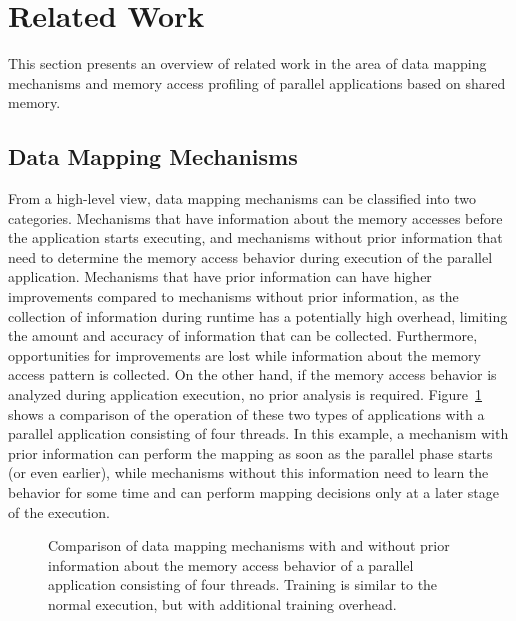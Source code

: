 
\section{Related Work}
\label{sec:soa}

This section presents an overview of related work in the area of data mapping mechanisms and memory access profiling of parallel applications based on shared memory.

\subsection{Data Mapping Mechanisms}
\label{sec:soa-mapping}

From a high-level view, data mapping mechanisms can be classified into two categories.
Mechanisms that have information about the memory accesses before the application starts executing, and mechanisms without prior information that need to determine the memory access behavior during execution of the parallel application.
Mechanisms that have prior information can have higher improvements compared to mechanisms without prior information, as the collection of information during runtime has a potentially high overhead, limiting the amount and accuracy of information that can be collected.
Furthermore, opportunities for improvements are lost while information about the memory access pattern is collected.
On the other hand, if the memory access behavior is analyzed during application execution, no prior analysis is required.
Figure~\ref{fig:timeline} shows a comparison of the operation of these two types of applications with a parallel application consisting of four threads.
In this example, a mechanism with prior information can perform the mapping as soon as the parallel phase starts (or even earlier), while mechanisms without this information need to learn the behavior for some time and can perform mapping decisions only at a later stage of the execution.

\begin{figure}[!b]
    
    \caption{Comparison of data mapping mechanisms with and without prior information about the memory access behavior of a parallel application consisting of four threads. Training is similar to the normal execution, but with additional training overhead.}
    \label{fig:timeline}
\end{figure}

